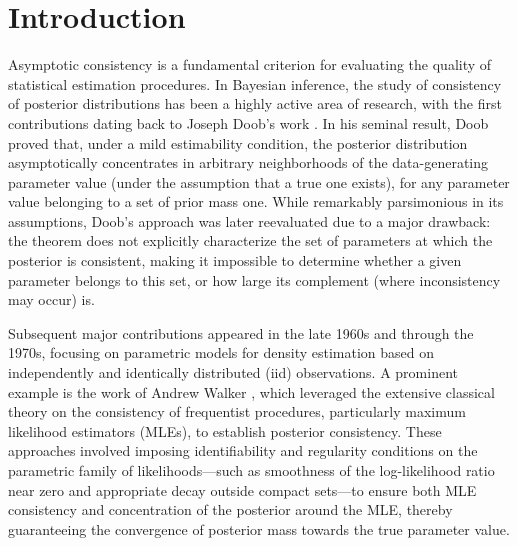 \documentclass[11pt,twoside]{article}
\begin{document}
\section{Introduction}\label{sec:introduction}

Asymptotic consistency is a fundamental criterion for evaluating the quality of statistical estimation procedures. In Bayesian inference, the study of consistency of posterior distributions has been a highly active area of research, with the first contributions dating back to Joseph Doob's work \citep{doob1949application}. In his seminal result, Doob proved that, under a mild estimability condition, the posterior distribution asymptotically concentrates in arbitrary neighborhoods of the data-generating parameter value (under the assumption that a true one exists), for any parameter value belonging to a set of prior mass one. While remarkably parsimonious in its assumptions, Doob's approach was later reevaluated due to a major drawback: the theorem does not explicitly characterize the set of parameters at which the posterior is consistent, making it impossible to determine whether a given parameter belongs to this set, or how large its complement (where inconsistency may occur) is.

Subsequent major contributions appeared in the late 1960s and through the 1970s, focusing on parametric models for density estimation based on independently and identically distributed (iid) observations. A prominent example is the work of Andrew Walker \citep{walker1969} \citep[see also][]{berk1970consistency}, which leveraged the extensive classical theory on the consistency of frequentist procedures, particularly maximum likelihood estimators (MLEs), to establish posterior consistency. These approaches involved imposing identifiability and regularity conditions on the parametric family of likelihoods—such as smoothness of the log-likelihood ratio near zero and appropriate decay outside compact sets—to ensure both MLE consistency and concentration of the posterior around the MLE, thereby guaranteeing the convergence of posterior mass towards the true parameter value.
\end{document}
